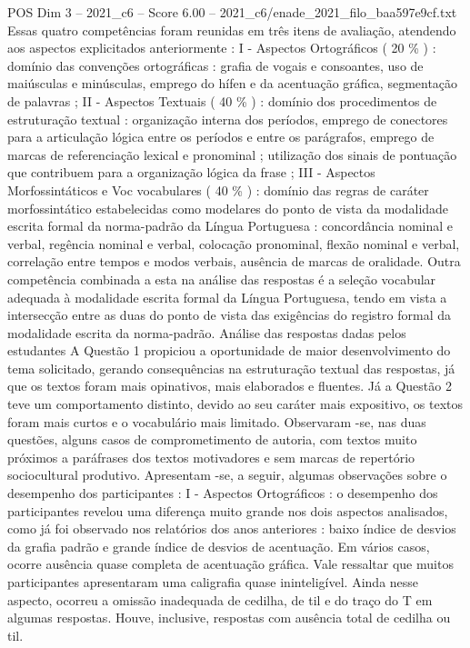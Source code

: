 \begin{textsample}{POS Dim 3 – 2021\_c6 – Score 6.00 – 2021\_c6/enade\_2021\_filo\_baa597e9cf.txt}
Essas quatro competências foram reunidas em três itens de avaliação, atendendo aos aspectos explicitados anteriormente : I - Aspectos Ortográficos ( 20 \% ) : domínio das convenções ortográficas : grafia de vogais e consoantes, uso de maiúsculas e minúsculas, emprego do hífen e da acentuação gráfica, segmentação de palavras ; II - Aspectos Textuais ( 40 \% ) : domínio dos procedimentos de estruturação textual : organização interna dos períodos, emprego de conectores para a articulação lógica entre os períodos e entre os parágrafos, emprego de marcas de referenciação lexical e pronominal ; utilização dos sinais de pontuação que contribuem para a organização lógica da frase ; III - Aspectos Morfossintáticos e Voc vocabulares ( 40 \% ) : domínio das regras de caráter morfossintático estabelecidas como modelares do ponto de vista da modalidade escrita formal da norma-padrão da Língua Portuguesa : concordância nominal e verbal, regência nominal e verbal, colocação pronominal, flexão nominal e verbal, correlação entre tempos e modos verbais, ausência de marcas de oralidade.
Outra competência combinada a esta na análise das respostas é a seleção vocabular adequada à modalidade escrita formal da Língua Portuguesa, tendo em vista a intersecção entre as duas do ponto de vista das exigências do registro formal da modalidade escrita da norma-padrão.
Análise das respostas dadas pelos estudantes A Questão 1 propiciou a oportunidade de maior desenvolvimento do tema solicitado, gerando consequências na estruturação textual das respostas, já que os textos foram mais opinativos, mais elaborados e fluentes.
Já a Questão 2 teve um comportamento distinto, devido ao seu caráter mais expositivo, os textos foram mais curtos e o vocabulário mais limitado.
Observaram -se, nas duas questões, alguns casos de comprometimento de autoria, com textos muito próximos a paráfrases dos textos motivadores e sem marcas de repertório sociocultural produtivo.
Apresentam -se, a seguir, algumas observações sobre o desempenho dos participantes : I - Aspectos Ortográficos : o desempenho dos participantes revelou uma diferença muito grande nos dois aspectos analisados, como já foi observado nos relatórios dos anos anteriores : baixo índice de desvios da grafia padrão e grande índice de desvios de acentuação.
Em vários casos, ocorre ausência quase completa de acentuação gráfica.
Vale ressaltar que muitos participantes apresentaram uma caligrafia quase ininteligível.
Ainda nesse aspecto, ocorreu a omissão inadequada de cedilha, de til e do traço do T em algumas respostas.
Houve, inclusive, respostas com ausência total de cedilha ou til.

\end{textsample}

